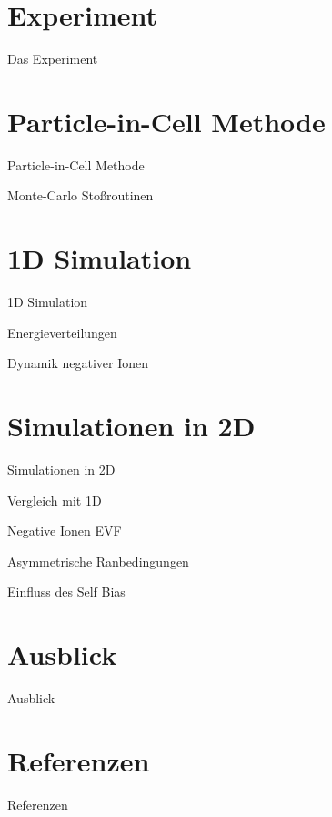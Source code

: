 \documentclass{beamer}
\begin{document}
	\section{Experiment}
%
		\begin{frame}{Das Experiment}
		\end{frame}
%
%
%
%
	\section{Particle-in-Cell Methode}
%
		\begin{frame}{Particle-in-Cell Methode}
		\end{frame}
%
		\begin{frame}{Monte-Carlo Stoßroutinen}
		\end{frame}
%
%
%
%
	\section{1D Simulation}
%
		\begin{frame}{1D Simulation}
		\end{frame}
%
		\begin{frame}{Energieverteilungen}
		\end{frame}
%
%
		\begin{frame}{Dynamik negativer Ionen}
		\end{frame}
%
%
%
%
	\section{Simulationen in 2D}
%
		\begin{frame}{Simulationen in 2D}
		\end{frame}
%
		\begin{frame}{Vergleich mit 1D}
		\end{frame}
%
		\begin{frame}{Negative Ionen EVF}
		\end{frame}
%
		\begin{frame}{Asymmetrische Ranbedingungen}
		\end{frame}
%
		\begin{frame}{Einfluss des Self Bias}
		\end{frame}
%
%
%
%
	\section{Ausblick}
%
		\begin{frame}{Ausblick}
		\end{frame}
%
%
	\section{Referenzen}
%
		\begin{frame}{Referenzen}
		\end{frame}
%
%
\end{document}

